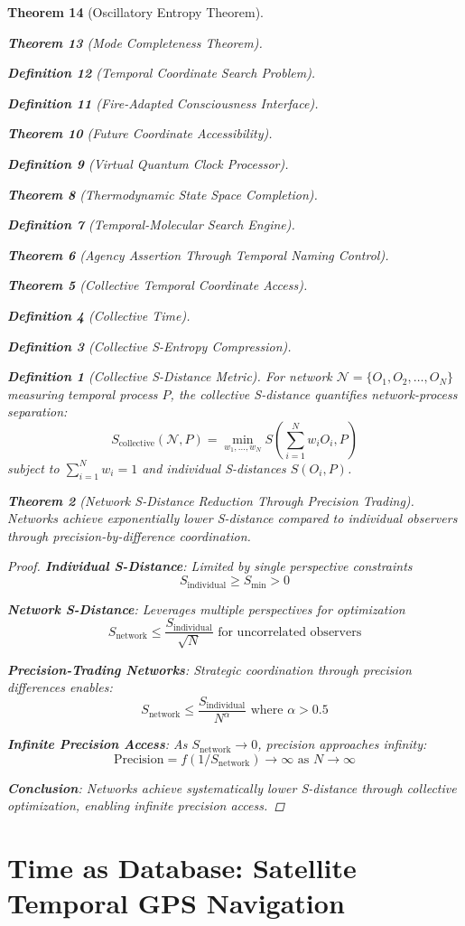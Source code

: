 \documentclass[12pt,a4paper]{article}
\newtheorem{theorem}{Theorem}[section]
\newtheorem{definition}[theorem]{Definition}
\begin{document}
\begin{theorem}[Oscillatory Entropy Theorem]
\begin{theorem}[Mode Completeness Theorem]
\begin{enumerate}
\begin{definition}[Temporal Coordinate Search Problem]
\begin{algorithm}
\begin{definition}[Fire-Adapted Consciousness Interface]
\begin{theorem}[Future Coordinate Accessibility]
\begin{definition}[Virtual Quantum Clock Processor]
\begin{itemize}
\begin{itemize}
\begin{theorem}[Thermodynamic State Space Completion]
\begin{definition}[Temporal-Molecular Search Engine]
\begin{theorem}[Agency Assertion Through Temporal Naming Control]
\begin{remark}
\begin{theorem}[Collective Temporal Coordinate Access]
\begin{definition}[Collective Time]
\begin{definition}[Collective S-Entropy Compression]
\begin{definition}[Collective S-Distance Metric]
For network $\mathcal{N} = \{O_1, O_2, \ldots, O_N\}$ measuring temporal process $P$, the collective S-distance quantifies network-process separation:
$$S_{\text{collective}}(\mathcal{N}, P) = \min_{w_1,\ldots,w_N} S\left(\sum_{i=1}^N w_i O_i, P\right)$$
subject to $\sum_{i=1}^N w_i = 1$ and individual S-distances $S(O_i, P)$.
\end{definition}

\begin{theorem}[Network S-Distance Reduction Through Precision Trading]
Networks achieve exponentially lower S-distance compared to individual observers through precision-by-difference coordination.
\end{theorem}

\begin{proof}
\textbf{Individual S-Distance}: Limited by single perspective constraints
$$S_{\text{individual}} \geq S_{\min} > 0$$

\textbf{Network S-Distance}: Leverages multiple perspectives for optimization
$$S_{\text{network}} \leq \frac{S_{\text{individual}}}{\sqrt{N}} \text{ for uncorrelated observers}$$

\textbf{Precision-Trading Networks}: Strategic coordination through precision differences enables:
$$S_{\text{network}} \leq \frac{S_{\text{individual}}}{N^{\alpha}} \text{ where } \alpha > 0.5$$

\textbf{Infinite Precision Access}: As $S_{\text{network}} \to 0$, precision approaches infinity:
$$\text{Precision} = f(1/S_{\text{network}}) \to \infty \text{ as } N \to \infty$$

\textbf{Conclusion}: Networks achieve systematically lower S-distance through collective optimization, enabling infinite precision access.
\end{proof}

\section{Time as Database: Satellite Temporal GPS Navigation}


\end{definition}
\end{definition}
\end{theorem}
\end{remark}
\end{theorem}
\end{definition}
\end{theorem}
\end{itemize}
\end{itemize}
\end{definition}
\end{theorem}
\end{definition}
\end{algorithm}
\end{definition}
\end{enumerate}
\end{theorem}
\end{theorem}
\end{document}
